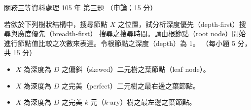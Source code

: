\begin{pastexam}[label={px:gw3-105-ds-03}]{關務三等資料處理 105 年 第三題}
（申論；15 分）

若欲於下列樹狀結構中，搜尋節點 $X$ 之位置，試分析深度優先（depth-first）搜尋與廣度優先（breadth-first）
搜尋之搜尋時間。請由根節點（root node）開始進行節點值比較之次數來表達。令根節點之深度（depth）為 1。
（每小題 5 分，共 15 分）
\begin{itemize}[leftmargin=2em, labelsep=0.3em, itemsep=2pt]
\item[㈠] $X$ 為深度為 $D$ 之偏斜（skewed）二元樹之葉節點（leaf node）。
\item[㈡] $X$ 為深度為 $D$ 之完美（perfect）二元樹之最右邊之葉節點。
\item[㈢] $X$ 為深度為 $D$ 之完美 $k$ 元（$k$-ary）樹之最左邊之葉節點。
\end{itemize}
\end{pastexam}

